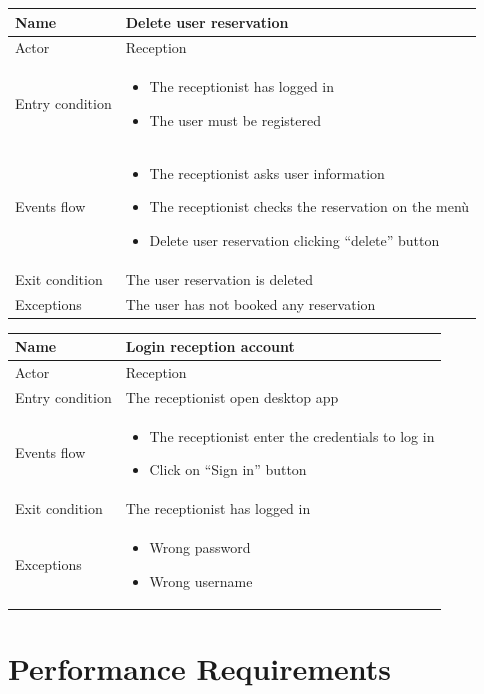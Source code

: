 \begin{tabular}{|p{5cm} | p{7cm} | }
	\hline
	Name & Delete user reservation \\
	\hline
	Actor & Reception \\
	\hline
	Entry condition &
	\begin{itemize}
		\item The receptionist has logged in 
		\item The user must be registered
	\end{itemize} \\
	\hline
	Events flow & 
	\begin{itemize}
		\item The receptionist asks user information
		\item The receptionist checks the reservation on the menù
		\item Delete user reservation clicking “delete” button
	\end{itemize} \\
	\hline
	Exit condition &
	The user reservation is deleted \\
	\hline 
	Exceptions & 
	The user has not booked any reservation \\
	\hline
\end{tabular}

\begin{tabular}{|p{5cm} | p{7cm} | }
	\hline
	Name & Login reception account \\
	\hline
	Actor & Reception \\
	\hline
	Entry condition &
	The receptionist open desktop app  \\
	\hline
	Events flow & 
	\begin{itemize}
		\item The receptionist enter the credentials to log in 
		\item Click on “Sign in” button
	\end{itemize} \\
	\hline
	Exit condition &
	The receptionist has logged in \\
	\hline 
	Exceptions & 
	\begin{itemize}
		\item Wrong password
		\item Wrong username
	\end{itemize} \\
	\hline
\end{tabular}


\section{Performance Requirements}
